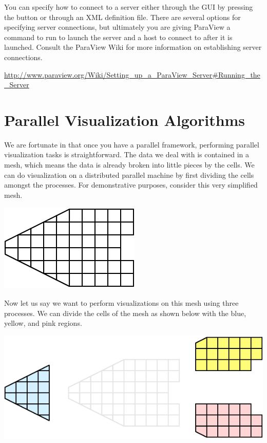 You can specify how to connect to a server either through the GUI by
pressing the  button or through an XML definition file.
There are several options for specifying server connections, but ultimately
you are giving ParaView a command to run to launch the server and a host to
connect to after it is launched.  Consult the ParaView Wiki for more
information on establishing server connections.

{
  \footnotesize
  \href{http://www.paraview.org/Wiki/Setting_up_a_ParaView_Server#Running_the_Server}{http://www.paraview.org/Wiki/Setting\_up\_a\_ParaView\_Server\#Running\_the\_Server}
}


\section{Parallel Visualization Algorithms}

We are fortunate in that once you have a parallel framework, performing
parallel visualization tasks is straightforward.  The data we deal with is
contained in a mesh, which means the data is already broken into little
pieces by the cells.  We can do visualization on a distributed parallel
machine by first dividing the cells amongst the processes.  For
demonstrative purposes, consider this very simplified mesh.

\begin{inlinefig}
  \includegraphics{images/ParallelExampleMesh}
\end{inlinefig}

Now let us say we want to perform visualizations on this mesh using three
processes.  We can divide the cells of the mesh as shown below with the
blue, yellow, and pink regions.

\begin{inlinefig}
  \includegraphics{images/ParallelExamplePartitions}
\end{inlinefig}

